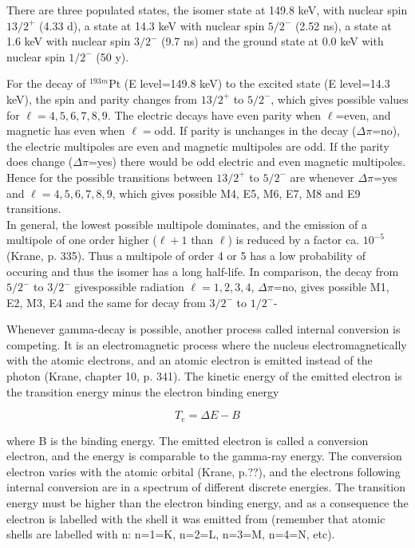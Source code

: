There are three populated states, the isomer state at 149.8 keV, with nuclear spin $13/2^+$ (4.33 d), a state at 14.3 keV with nuclear spin $5/2^-$ (2.52 ns), a state at 1.6 keV with nuclear spin $3/2^-$ (9.7 ns) and the ground state at 0.0 keV with nuclear spin $1/2^-$ (50 y)\cite{ShamsuzzohaBasunia2017a}. 

For the decay of $^{193m}$Pt (E level=149.8 keV) to the excited state (E level=14.3 keV), the spin and parity changes from $13/2^+$ to $5/2^-$, which gives possible values for $\ell=4,5,6,7,8,9$. The electric decays have even parity when $\ell$=even, and magnetic has even when $\ell=$odd. If parity is unchanges in the decay ($\Delta\pi$=no), the electric multipoles are even and magnetic multipoles are odd. If the parity does change ($\Delta \pi$=yes) there would be odd electric and even magnetic multipoles. Hence for the possible transitions between $13/2^+$ to $5/2^-$ are whenever $\Delta \pi$=yes and $\ell=4,5,6,7,8,9$, which gives possible M4, E5, M6, E7, M8 and E9 transitions. \\

In general, the lowest possible multipole dominates, and the emission of a multipole of one order higher  ($\ell+1$ than $\ell$) is reduced by a factor ca. $10^{-5}$ (Krane, p. 335). Thus a multipole of order 4 or 5 has a low probability of occuring and thus the isomer has a long half-life. In comparison, the decay from $5/2^-$ to $3/2^-$ givespossible radiation $\ell=1,2,3,4$, $\Delta\pi$=no, gives possible M1, E2, M3, E4 and the same for decay from $3/2^-$ to $1/2^-$- 

Whenever gamma-decay is possible, another process called internal conversion is competing. It is an electromagnetic process where the nucleus electromagnetically with the atomic electrons, and an atomic electron is emitted instead of the photon (Krane, chapter 10, p. 341). The kinetic energy of the emitted electron is the transition energy minus the electron binding energy 

\begin{equation}
    T_e = \Delta E -B
\end{equation}

where B is the binding energy. The emitted electron is called a conversion electron, and the energy is comparable to the gamma-ray energy. The conversion electron varies with the atomic orbital (Krane, p.??), and the electrons following internal conversion are in a spectrum of different discrete energies. The transition energy must be higher than the electron binding energy, and as a consequence the electron is labelled with the shell it was emitted from (remember that atomic shells are labelled with n: n=1=K, n=2=L, n=3=M, n=4=N, etc). \\


